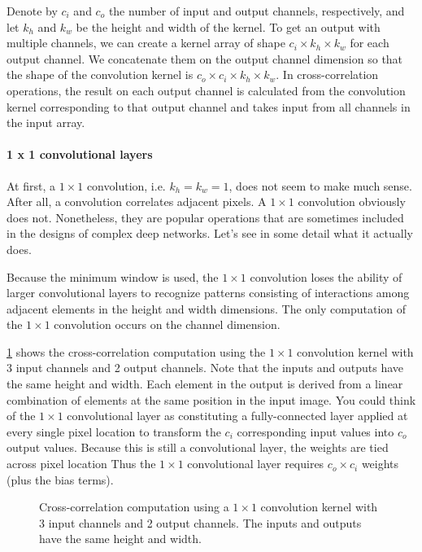 Denote by $c_i$ and $c_o$  the number of input and output channels, respectively, and let $k_h$ and $k_w$ be the height and width of the kernel. To get an output with multiple channels, we can create a kernel array of shape $c_i \times k_h \times k_w$ for each output channel. We concatenate them on the output channel dimension so that the shape of the convolution kernel is $c_o \times c_i \times k_h \times k_w$. In cross-correlation operations, the result on each output channel is calculated from the convolution kernel corresponding to that output channel and takes input from all channels in the input array.

\paragraph{1 x 1 convolutional layers}

At first, a $1 \times 1$  convolution, i.e.  $k_h=k_w=1$, does not seem to make much sense. After all, a convolution correlates adjacent pixels. A $1 \times 1$ convolution obviously does not. Nonetheless, they are popular operations that are sometimes included in the designs of complex deep networks. Let’s see in some detail what it actually does.

Because the minimum window is used, the $1 \times 1$ convolution loses the ability of larger convolutional layers to recognize patterns consisting of interactions among adjacent elements in the height and width dimensions. The only computation of the $1 \times 1$ convolution occurs on the channel dimension.

\cref{fig:conv_1x1} shows the cross-correlation computation using the $1 \times 1$ convolution kernel with 3 input channels and 2 output channels. Note that the inputs and outputs have the same height and width. Each element in the output is derived from a linear combination of elements at the same position in the input image. You could think of the $1 \times 1$  convolutional layer as constituting a fully-connected layer applied at every single pixel location to transform the $c_i$ corresponding input values into $c_o$ output values. Because this is still a convolutional layer, the weights are tied across pixel location Thus the $1 \times 1$  convolutional layer requires $c_o \times c_i$ weights (plus the bias terms).

\begin{figure}[hpt]
    \centering
    
    \caption{Cross-correlation computation using a $1 \times 1$ convolution kernel with 3 input channels and 2 output channels. The inputs and outputs have the same height and width.}
    \label{fig:conv_1x1}
\end{figure}

